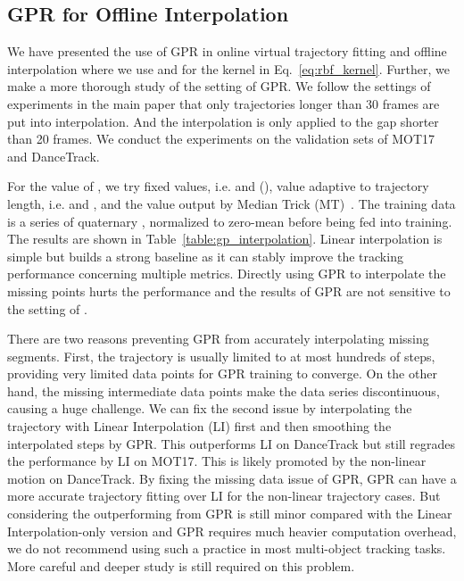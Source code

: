 \documentclass[10pt,twocolumn,letterpaper]{article}
\begin{document}
\subsection{GPR for Offline Interpolation}
We have presented the use of GPR in online virtual trajectory fitting and offline interpolation where we use  and  for the kernel in Eq.~\ref{eq:rbf_kernel}. Further, we make a more thorough study of the setting of GPR.
We follow the settings of experiments in the main paper that only trajectories longer than 30 frames are put into interpolation. And the interpolation is only applied to the gap shorter than 20 frames. We conduct the experiments on the validation sets of MOT17 and DanceTrack.

For the value of , we try fixed values, i.e.  and  (), value adaptive to trajectory length, i.e.  and , and the value output by Median Trick (MT)~\cite{garreau2017large}.
The training data is a series of quaternary , normalized to zero-mean before being fed into training.
The results are shown in Table~\ref{table:gp_interpolation}. Linear interpolation is simple but builds a strong baseline as it can stably improve the tracking performance concerning multiple metrics. 
Directly using GPR to interpolate the missing points hurts the performance and the results of GPR are not sensitive to the setting of . 

There are two reasons preventing GPR from accurately interpolating missing segments. First, the trajectory is usually limited to at most hundreds of steps, providing very limited data points for GPR training to converge. On the other hand, the missing intermediate data points make the data series discontinuous, causing a huge challenge. We can fix the second issue by interpolating the trajectory with Linear Interpolation (LI) first and then smoothing the interpolated steps by GPR. This outperforms LI on DanceTrack but still regrades the performance by LI on MOT17. This is likely promoted by the non-linear motion on DanceTrack. By fixing the missing data issue of GPR, GPR can have a more accurate trajectory fitting over LI for the non-linear trajectory cases. But considering the outperforming from GPR is still minor compared with the Linear Interpolation-only version and GPR requires much heavier computation overhead, we do not recommend using such a practice in most multi-object tracking tasks. More careful and deeper study is still required on this problem.
\end{document}
